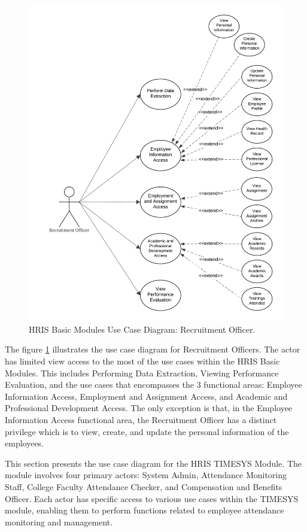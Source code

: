     \begin{figure}[H]
        \centering
        \includegraphics[width=0.9\linewidth]{figures/images/diagrams/usecase/use-case-basic-8.png}
        \caption{HRIS Basic Modules Use Case Diagram: Recruitment Officer.}
        \label{fig:use-case-basic-8}
    \end{figure}

    The figure \ref{fig:use-case-basic-8} illustrates the use case diagram for Recruitment Officers. The actor has limited view access to the most of the use cases within the HRIS Basic Modules. This includes Performing Data Extraction, Viewing Performance Evaluation, and the use cases that  encompasses the 3 functional areas: Employee Information Access, Employment and Assignment Access, and Academic and Professional Development Access. The only exception is that,  in the Employee Information Access functional area, the Recruitment Officer has a distinct privilege which is to view, create, and update the personal information of the employees.


    This section presents the use case diagram for the HRIS TIMESYS Module. The module involves four primary actors: System Admin, Attendance Monitoring Staff, College Faculty Attendance Checker, and Compensation and Benefits Officer. Each actor has specific access to various use cases within the TIMESYS module, enabling them to perform functions related to employee attendance monitoring and management.

